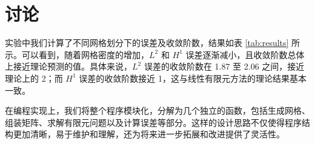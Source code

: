 \documentclass{article}
\begin{document}
\section{讨论}
实验中我们计算了不同网格划分下的误差及收敛阶数，结果如表 \ref{tab:results} 所示。可以看到，随着网格密度的增加，\( L^2 \) 和 \( H^1 \) 误差逐渐减小，且收敛阶数总体上接近理论预测的值。具体来说，\( L^2 \) 误差的收敛阶数在 1.87 至 2.06 之间，接近理论上的 2；而 \( H^1 \) 误差的收敛阶数接近 1，这与线性有限元方法的理论结果基本一致。

在编程实现上，我们将整个程序模块化，分解为几个独立的函数，包括生成网格、组装矩阵、求解有限元问题以及计算误差等部分。这样的设计思路不仅使得程序结构更加清晰，易于维护和理解，还为将来进一步拓展和改进提供了灵活性。
\end{document}
